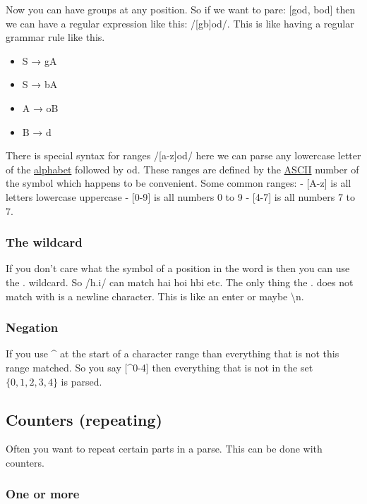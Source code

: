 \documentclass[
  11pt,
  british,
]{article}
\providecommand{\tightlist}{%
  \setlength{\itemsep}{0pt}\setlength{\parskip}{0pt}}
\begin{document}
Now you can have groups at any position. So if we want to pare: {[}god,
bod{]} then we can have a regular expression like this: /{[}gb{]}od/.
This is like having a regular grammar rule like this.

\begin{itemize}
\tightlist
\item
  S → gA
\item
  S → bA
\item
  A → oB
\item
  B → d
\end{itemize}

There is special syntax for ranges /{[}a-z{]}od/ here we can parse any
lowercase letter of the \href{Alphabet.md}{alphabet} followed by od.
These ranges are defined by the
\href{https://en.wikipedia.org/wiki/ASCII}{ASCII} number of the symbol
which happens to be convenient. Some common ranges: - {[}A-z{]} is all
letters lowercase uppercase - {[}0-9{]} is all numbers 0 to 9 -
{[}4-7{]} is all numbers 7 to 7.

\hypertarget{the-wildcard}{%
\subsubsection{The wildcard}\label{the-wildcard}}

If you don't care what the symbol of a position in the word is then you
can use the . wildcard. So /h.i/ can match hai hoi hbi etc. The only
thing the . does not match with is a newline character. This is like an
enter or maybe \textbackslash n.~

\hypertarget{negation}{%
\subsubsection{Negation}\label{negation}}

If you use \^{} at the start of a character range than everything that
is not this range matched. So you say {[}\^{}0-4{]} then everything that
is not in the set \(\{0,1,2,3,4\}\) is parsed.

\hypertarget{counters-repeating}{%
\subsection{Counters (repeating)}\label{counters-repeating}}

Often you want to repeat certain parts in a parse. This can be done with
counters.

\hypertarget{one-or-more}{%
\subsubsection{One or more}\label{one-or-more}}
\end{document}
